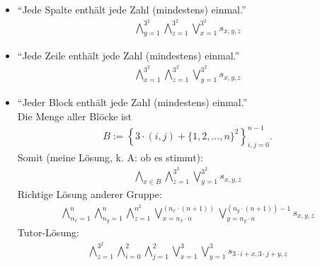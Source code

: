 \documentclass[12pt,a4paper]{article}
\begin{document}
\begin{aufgabe}
\begin{itemize}
\item ``Jede Spalte enthält jede Zahl (mindestens) einmal.''
\begin{align*}
\bigwedge\limits_{y=1}^{3^2}\bigwedge\limits_{z=1}^{3^2}\bigvee\limits_{x=1}^{3^2} s_{x,y,z}
\end{align*}
\item ``Jede Zeile enthält jede Zahl (mindestens) einmal.''
\begin{align*}
\bigwedge\limits_{x=1}^{3^2}\bigwedge\limits_{z=1}^{3^2}\bigvee\limits_{y=1}^{3^2} s_{x,y,z}
\end{align*}
\item ``Jeder Block enthält jede Zahl (mindestens) einmal.''\\
Die Menge aller Blöcke ist
\begin{align*}
B:=\left\lbrace 3\cdot(i,j)+\lbrace1,2,\ldots,n\rbrace^2\right\rbrace_{i,j=0}^{n-1}.
\end{align*}
Somit (meine Lösung, k. A: ob es stimmt):
\begin{align*}
\bigwedge\limits_{x\in B}\bigwedge\limits_{z=1}^{3^2}\bigvee\limits_{y=1}^{3^2} s_{x,y,z}
\end{align*}
Richtige Lösung anderer Gruppe:
\begin{align*}
\bigwedge\limits_{n_x=1}^n\bigwedge\limits_{n_y=1}^n\bigwedge\limits_{z=1}^{n^2}\bigvee\limits_{x=n_x\cdot n}^{(n_x\cdot(n+1))}\bigvee\limits_{y=n_y\cdot n}^{(n_y\cdot(n+1))-1} s_{x,y,z}
\end{align*}
Tutor-Lösung:
\begin{align*}
\bigwedge\limits_{z=1}^{3^2}\bigwedge\limits_{i=0}^{2}\bigwedge\limits_{j=1}^2\bigvee\limits_{x=1}^{3}\bigvee\limits_{y=1}^3 s_{3\cdot i+x,3\cdot j+y,z}
\end{align*}
\end{itemize}
\end{aufgabe}
\end{document}
